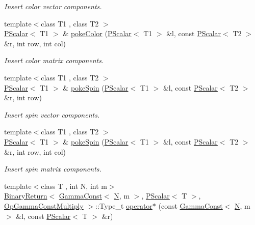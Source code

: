 \begin{DoxyCompactItemize}
\begin{DoxyCompactList}\small\item\em Insert color vector components. \end{DoxyCompactList}\item 
{\footnotesize template$<$class T1 , class T2 $>$ }\\\mbox{\hyperlink{classENSEM_1_1PScalar}{P\+Scalar}}$<$ T1 $>$ \& \mbox{\hyperlink{group__primscalar_ga540606e7a9a4e2fbb97da4a95bc1c21f}{poke\+Color}} (\mbox{\hyperlink{classENSEM_1_1PScalar}{P\+Scalar}}$<$ T1 $>$ \&l, const \mbox{\hyperlink{classENSEM_1_1PScalar}{P\+Scalar}}$<$ T2 $>$ \&r, int row, int col)
\begin{DoxyCompactList}\small\item\em Insert color matrix components. \end{DoxyCompactList}\item 
{\footnotesize template$<$class T1 , class T2 $>$ }\\\mbox{\hyperlink{classENSEM_1_1PScalar}{P\+Scalar}}$<$ T1 $>$ \& \mbox{\hyperlink{group__primscalar_gaef0821cb16093e96134a98e5a765c45a}{poke\+Spin}} (\mbox{\hyperlink{classENSEM_1_1PScalar}{P\+Scalar}}$<$ T1 $>$ \&l, const \mbox{\hyperlink{classENSEM_1_1PScalar}{P\+Scalar}}$<$ T2 $>$ \&r, int row)
\begin{DoxyCompactList}\small\item\em Insert spin vector components. \end{DoxyCompactList}\item 
{\footnotesize template$<$class T1 , class T2 $>$ }\\\mbox{\hyperlink{classENSEM_1_1PScalar}{P\+Scalar}}$<$ T1 $>$ \& \mbox{\hyperlink{group__primscalar_gafc9650865b3cf15e32d79e07d1c01eff}{poke\+Spin}} (\mbox{\hyperlink{classENSEM_1_1PScalar}{P\+Scalar}}$<$ T1 $>$ \&l, const \mbox{\hyperlink{classENSEM_1_1PScalar}{P\+Scalar}}$<$ T2 $>$ \&r, int row, int col)
\begin{DoxyCompactList}\small\item\em Insert spin matrix components. \end{DoxyCompactList}\item 
{\footnotesize template$<$class T , int N, int m$>$ }\\\mbox{\hyperlink{structENSEM_1_1BinaryReturn}{Binary\+Return}}$<$ \mbox{\hyperlink{classENSEM_1_1GammaConst}{Gamma\+Const}}$<$ \mbox{\hyperlink{operator__name__util_8cc_a7722c8ecbb62d99aee7ce68b1752f337}{N}}, m $>$, \mbox{\hyperlink{classENSEM_1_1PScalar}{P\+Scalar}}$<$ T $>$, \mbox{\hyperlink{structENSEM_1_1OpGammaConstMultiply}{Op\+Gamma\+Const\+Multiply}} $>$\+::Type\+\_\+t \mbox{\hyperlink{group__primscalar_gaa4466bc56a8afcb00e7d7e37cc22d441}{operator$\ast$}} (const \mbox{\hyperlink{classENSEM_1_1GammaConst}{Gamma\+Const}}$<$ \mbox{\hyperlink{operator__name__util_8cc_a7722c8ecbb62d99aee7ce68b1752f337}{N}}, m $>$ \&l, const \mbox{\hyperlink{classENSEM_1_1PScalar}{P\+Scalar}}$<$ T $>$ \&r)

\end{DoxyCompactItemize}
